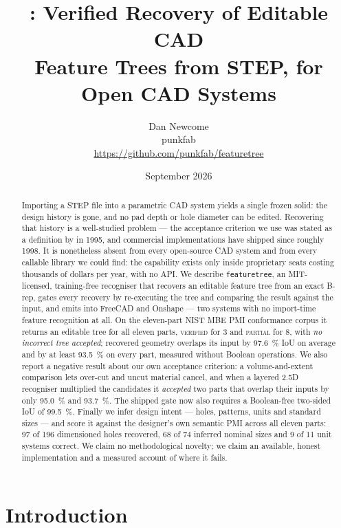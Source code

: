 \documentclass[11pt]{article}
\title{\textbf{\code{featuretree}: Verified Recovery of Editable CAD\\
Feature Trees from STEP, for Open CAD Systems}}
\author{Dan Newcome\\[2pt]
  \small punkfab\\
  \small\url{https://github.com/punkfab/featuretree}}
\date{September 2026}
\newcommand{\code}[1]{\texttt{\small #1}}
\newcommand{\VERIFIED}{\textsc{verified}}
\newcommand{\PARTIAL}{\textsc{partial}}
\begin{document}
\maketitle

\begin{abstract}
Importing a STEP file into a parametric CAD system yields a single frozen solid:
the design history is gone, and no pad depth or hole diameter can be edited.
Recovering that history is a well-studied problem --- the acceptance criterion
we use was stated as a definition by \citet{TODO-gupta-nau} in 1995, and
commercial implementations have shipped since roughly 1998. It is nonetheless
absent from every open-source CAD system and from every callable library we
could find: the capability exists only inside proprietary seats costing
thousands of dollars per year, with no API. We describe \code{featuretree}, an
MIT-licensed, training-free recogniser that recovers an editable feature tree
from an exact B-rep, gates every recovery by re-executing the tree and comparing
the result against the input, and emits into FreeCAD and Onshape --- two systems
with no import-time feature recognition at all. On the eleven-part NIST MBE PMI
conformance corpus it returns an editable tree for all eleven parts, \VERIFIED{}
for 3 and \PARTIAL{} for 8, with \emph{no incorrect tree accepted}; recovered
geometry overlaps its input by \SI{97.6}{\percent} IoU on average and by at least
\SI{93.5}{\percent} on every part, measured without Boolean operations. We also
report a negative result about our own acceptance criterion: a volume-and-extent
comparison lets over-cut and uncut material cancel, and when a layered 2.5D
recogniser multiplied the candidates it \emph{accepted} two parts that overlap
their inputs by only \SI{95.0}{\percent} and \SI{93.7}{\percent}. The shipped
gate now also requires a Boolean-free two-sided IoU of \SI{99.5}{\percent}.
Finally we infer design intent --- holes, patterns, units and standard sizes ---
and score it against the designer's own semantic PMI across all eleven parts: 97
of 196 dimensioned holes recovered, 68 of 74 inferred nominal sizes and 9 of 11
unit systems correct. We claim no methodological novelty; we claim an available,
honest implementation and a measured account of where it fails.
\end{abstract}

\section{Introduction}
\end{document}
